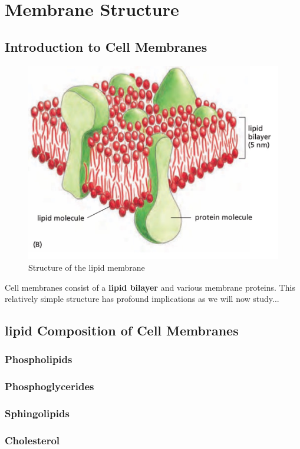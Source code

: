 \documentclass[../main.tex]{subfiles}
\begin{document}
    \section{Membrane Structure}

        \subsection{Introduction to Cell Membranes}
        \begin{figure}[H]
            \centering
            \includegraphics[width=0.5\linewidth]{lipid_membrane_structure.png}
            \caption{Structure of the lipid membrane}
            \label{fig:membrane}
        \end{figure}

        Cell membranes consist of a \textbf{lipid bilayer} and various membrane proteins. This relatively simple structure has profound implications as we will now study...


        \subsection{lipid Composition of Cell Membranes}
            
        
        \subsubsection{Phospholipids}


        \subsubsection{Phosphoglycerides}

        \subsubsection{Sphingolipids}


        \subsubsection{Cholesterol}
\end{document}
